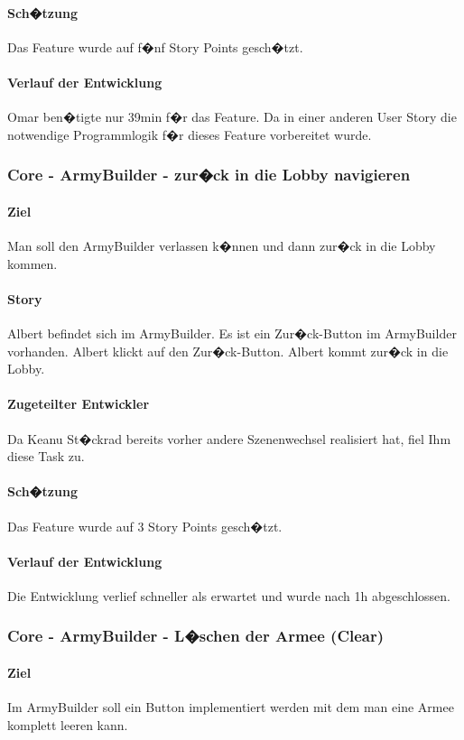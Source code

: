 \documentclass[12pt, titlepage]{scrartcl}
\begin{document}
		\paragraph{Sch�tzung}
		Das Feature wurde auf f�nf Story Points gesch�tzt.
		\paragraph{Verlauf der Entwicklung} Omar ben�tigte nur 39min f�r das Feature. Da in einer anderen User Story die notwendige Programmlogik f�r dieses Feature vorbereitet wurde.
		
		\subsubsection{Core - ArmyBuilder - zur�ck in die Lobby navigieren}
		\paragraph{Ziel} Man soll den ArmyBuilder verlassen k�nnen und dann zur�ck in die Lobby kommen.
		\paragraph{Story} Albert befindet sich im ArmyBuilder. Es ist ein Zur�ck-Button im ArmyBuilder vorhanden. Albert klickt auf den Zur�ck-Button. Albert kommt zur�ck in die Lobby.
		\paragraph{Zugeteilter Entwickler} Da Keanu St�ckrad bereits vorher andere Szenenwechsel realisiert hat, fiel Ihm diese Task zu.
		\paragraph{Sch�tzung}
		Das Feature wurde auf 3 Story Points gesch�tzt.
		\paragraph{Verlauf der Entwicklung} 
		Die Entwicklung verlief schneller als erwartet und wurde nach 1h abgeschlossen.
		
		\subsubsection{Core - ArmyBuilder - L�schen der Armee (Clear)}
		\paragraph{Ziel} Im ArmyBuilder soll ein Button implementiert werden mit dem man eine Armee komplett leeren kann.
\end{document}
